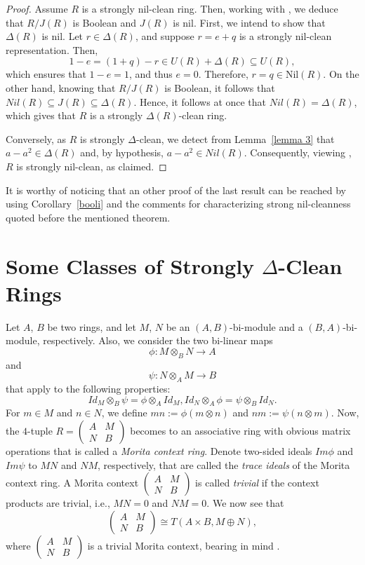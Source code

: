 \documentclass[12pt]{amsart}
\theoremstyle{definition}
\begin{document}
\begin{proof}
Assume $R$ is a strongly nil-clean ring. Then, working with \cite[Theorem 2.7]{kwz}, we deduce that $R/J(R)$ is Boolean and $J(R)$ is nil. First, we intend to show that $\Delta(R)$ is nil. Let $r \in \Delta(R)$, and suppose $r = e + q$ is a strongly nil-clean representation. Then, $$1 - e = (1 + q) - r \in U(R) + \Delta(R) \subseteq U(R),$$ which ensures that $1 - e = 1$, and thus $e = 0$. Therefore, $r = q \in \text{Nil}(R)$. On the other hand, knowing that $R/J(R)$ is Boolean, it follows that $ Nil(R) \subseteq J(R) \subseteq \Delta(R)$. Hence, it follows at once that $Nil(R) = \Delta(R)$, which gives that $R$ is a strongly $\Delta(R)$-clean ring.

Conversely, as $R$ is strongly $\Delta$-clean, we detect from Lemma~\ref{lemma 3} that $a-a^2\in \Delta(R)$ and, by hypothesis, $a-a^2\in Nil(R)$. Consequently, viewing \cite[Theorem 3]{hty}, $R$ is strongly nil-clean, as claimed.
\end{proof}

It is worthy of noticing that an other proof of the last result can be reached by using Corollary~\ref{booli} and the comments for characterizing strong nil-cleanness quoted before the mentioned theorem.

\section{Some Classes of Strongly $\Delta$-Clean Rings}

Let $A$, $B$ be two rings, and let $M$, $N$ be an $(A,B)$-bi-module and a $(B,A)$-bi-module, respectively. Also, we consider the two bi-linear maps $$\phi :M\otimes_{B}N\rightarrow A$$ and $$\psi:N\otimes_{A}M\rightarrow B$$ that apply to the following properties:
$$Id_{M}\otimes_{B}\psi =\phi \otimes_{A}Id_{M},Id_{N}\otimes_{A}\phi =\psi \otimes_{B}Id_{N}.$$
For $m\in M$ and $n\in N$, we define $mn:=\phi (m\otimes n)$ and $nm:=\psi (n\otimes m)$. Now, the $4$-tuple $R=\begin{pmatrix}
	A & M\\
	N & B
\end{pmatrix}$ becomes to an associative ring with obvious matrix operations that is called a {\it Morita context ring}. Denote two-sided ideals $Im \phi$ and $Im \psi$ to $MN$ and $NM$, respectively, that are called the {\it trace ideals} of the Morita context ring. A Morita context $\begin{pmatrix}
	A & M\\
	N & B
\end{pmatrix}$ is called {\it trivial} if the context products are trivial, i.e., $MN=0$ and $NM=0$. We now see that
$$\begin{pmatrix}
	A & M\\
	N & B
\end{pmatrix}\cong T(A\times B, M\oplus N),$$
where
$\begin{pmatrix}
	A & M\\
	N & B
\end{pmatrix}$ is a trivial Morita context, bearing in mind \cite{20}.
\end{document}
